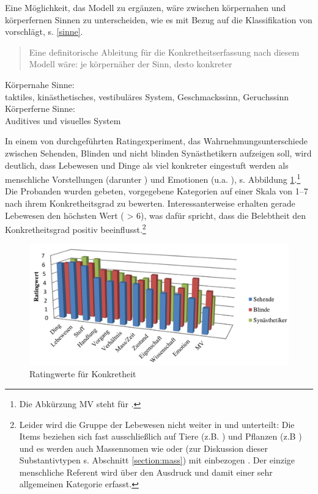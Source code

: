 Eine Möglichkeit, das Modell zu ergänzen, wäre zwischen körpernahen und körperfernen Sinnen zu unterscheiden, wie es \textcite[42]{Schrauf2011} mit Bezug auf die Klassifikation von \textcite{Zimmer2007} vorschlägt, s. \ref{sinne}. \blockcquote[42]{Schrauf2011}{Eine definitorische Ableitung für die Konkretheitserfassung nach diesem Modell wäre: je körpernäher der Sinn, desto konkreter}.   


\begin{exe}
	\ex \label{sinne}
	\begin{xlist}
		\ex \label{nah} Körpernahe Sinne: \\ taktiles, kinästhetisches, vestibuläres System, Geschmackssinn, Geruchssinn
		\ex \label{fern} Körperferne Sinne: \\ Auditives und visuelles System
	\end{xlist}
\end{exe}

In einem von \textcite[163--166]{Schrauf2011} durchgeführten Ratingexperiment, das Wahrnehmungsunterschiede zwischen Sehenden, Blinden und nicht blinden Synästhetikern aufzeigen soll, wird deutlich, dass Lebewesen und Dinge als viel konkreter eingestuft werden als menschliche Vorstellungen (darunter ) und Emotionen (u.a. ), s. Abbildung \ref{abb:schrauf-rating}.\footnote{Die Abkürzung MV steht für .} Die Probanden wurden gebeten, vorgegebene Kategorien auf einer Skala von 1--7 nach ihrem Konkretheitsgrad zu bewerten. Interessanterweise erhalten gerade Lebewesen den höchsten Wert ( > 6), was dafür spricht, dass die Belebtheit den Konkretheitsgrad positiv beeinflusst.\footnote{Leider wird die Gruppe der Lebewesen nicht weiter in  und  unterteilt: Die Items beziehen sich fast ausschließlich auf Tiere (z.B. ) und Pflanzen (z.B ) und es werden auch Massennomen wie  oder  (zur Diskussion dieser Substantivtypen s. Abschnitt \ref{section:mass}) mit einbezogen \parencite[143]{Schrauf2011}. Der einzige menschliche Referent wird über den Ausdruck  und damit einer sehr allgemeinen Kategorie erfasst.}

\begin{figure}
\begin{center}
\includegraphics[width=12cm]{images/rating-konkret-abstrakt-schrauf-neu.jpg}
\caption {Ratingwerte für Konkretheit \parencite[][162]{Schrauf2011}}
\label{abb:schrauf-rating}
\end{center}
\end{figure}

